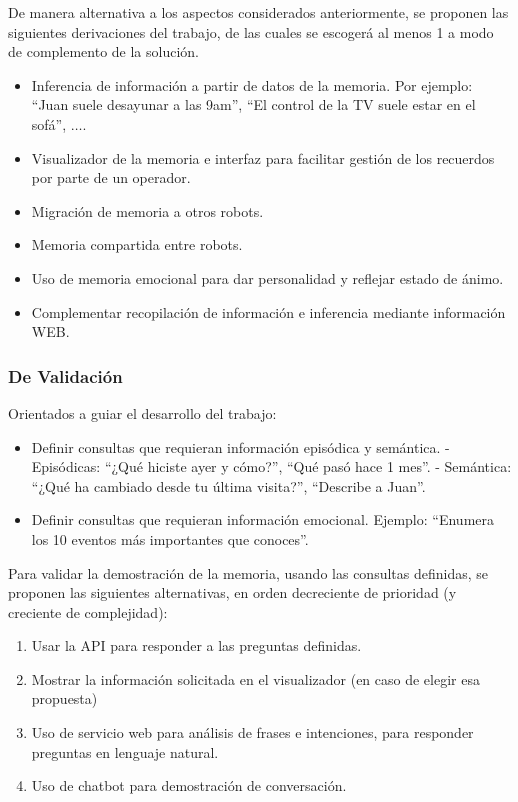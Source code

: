 \documentclass[12pt,letterpaper,spanish]{article}
\begin{document}
De manera alternativa a los aspectos considerados anteriormente, se proponen las siguientes derivaciones del trabajo, de las cuales se escoger\'a al menos 1 a modo de complemento de la soluci\'on.
\begin{itemize}
\item Inferencia de informaci\'on a partir de datos de la memoria. Por ejemplo: ``Juan suele desayunar a las 9am'', ``El control de la TV suele estar en el sof\'a'', $\ldots$.
\item Visualizador de la memoria e interfaz para facilitar gesti\'on de los recuerdos por parte de un operador.
\item Migraci\'on de memoria a otros robots.
\item Memoria compartida entre robots.
\item Uso de memoria emocional para dar personalidad y reflejar estado de \'animo.
\item Complementar recopilaci\'on de informaci\'on e inferencia mediante informaci\'on WEB.
\end{itemize}


\subsubsection{De Validaci\'on}

Orientados a guiar el desarrollo del trabajo:
\begin{itemize}
\item Definir consultas que requieran informaci\'on epis\'odica y sem\'antica.
\subitem - Epis\'odicas: ``¿Qu\'e hiciste ayer y c\'omo?'', ``Qu\'e pas\'o hace 1 mes''.
\subitem - Sem\'antica: ``¿Qu\'e ha cambiado desde tu \'ultima visita?'', ``Describe a Juan''.
\item Definir consultas que requieran informaci\'on emocional. Ejemplo: ``Enumera los 10 eventos m\'as importantes que conoces''.
\end{itemize}

Para validar la demostraci\'on de la memoria, usando las consultas definidas, se proponen las siguientes alternativas, en orden decreciente de prioridad (y creciente de complejidad):
\begin{enumerate}
\item Usar la API para responder a las preguntas definidas.
\item Mostrar la informaci\'on solicitada en el visualizador (en caso de elegir esa propuesta)
\item Uso de servicio web para an\'alisis de frases e intenciones, para responder preguntas en lenguaje natural.
\item Uso de chatbot para demostraci\'on de conversaci\'on.
\end{enumerate}
\end{document}

